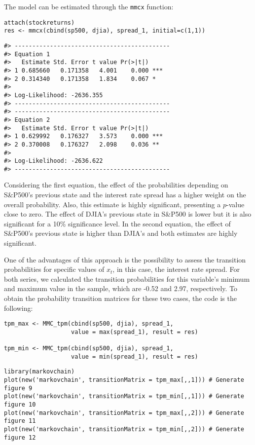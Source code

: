 \newpage

The model can be estimated through the \texttt{mmcx} function:

\begin{verbatim}
attach(stockreturns)
res <- mmcx(cbind(sp500, djia), spread_1, initial=c(1,1))
\end{verbatim}

\begin{verbatim}
#> --------------------------------------------
#> Equation 1 
#>   Estimate Std. Error t value Pr(>|t|)    
#> 1 0.685660   0.171358   4.001    0.000 ***
#> 2 0.314340   0.171358   1.834    0.067 *  
#> 
#> Log-Likelihood: -2636.355 
#> --------------------------------------------
#> --------------------------------------------
#> Equation 2 
#>   Estimate Std. Error t value Pr(>|t|)    
#> 1 0.629992   0.176327   3.573    0.000 ***
#> 2 0.370008   0.176327   2.098    0.036 ** 
#> 
#> Log-Likelihood: -2636.622 
#> --------------------------------------------
\end{verbatim}

Considering the first equation, the effect of the probabilities depending on S\&P500's previous state and the interest rate spread has a higher weight on the overall probability. Also, this estimate is highly significant, presenting a \(p\)-value close to zero. The effect of DJIA's previous state in S\&P500 is lower but it is also significant for a 10\% significance level. In the second equation, the effect of S\&P500's previous state is higher than DJIA's and both estimates are highly significant.

One of the advantages of this approach is the possibility to assess the transition probabilities for specific values of \(x_t\), in this case, the interest rate spread. For both series, we calculated the transition probabilities for this variable's minimum and maximum value in the sample, which are -0.52 and 2.97, respectively. To obtain the probability transition matrices for these two cases, the code is the following:

\begin{verbatim}
tpm_max <- MMC_tpm(cbind(sp500, djia), spread_1, 
                   value = max(spread_1), result = res)

tpm_min <- MMC_tpm(cbind(sp500, djia), spread_1, 
                   value = min(spread_1), result = res)
\end{verbatim}

\begin{verbatim}
library(markovchain)
plot(new('markovchain', transitionMatrix = tpm_max[,,1])) # Generate figure 9
plot(new('markovchain', transitionMatrix = tpm_min[,,1])) # Generate figure 10
plot(new('markovchain', transitionMatrix = tpm_max[,,2])) # Generate figure 11
plot(new('markovchain', transitionMatrix = tpm_min[,,2])) # Generate figure 12
\end{verbatim}

